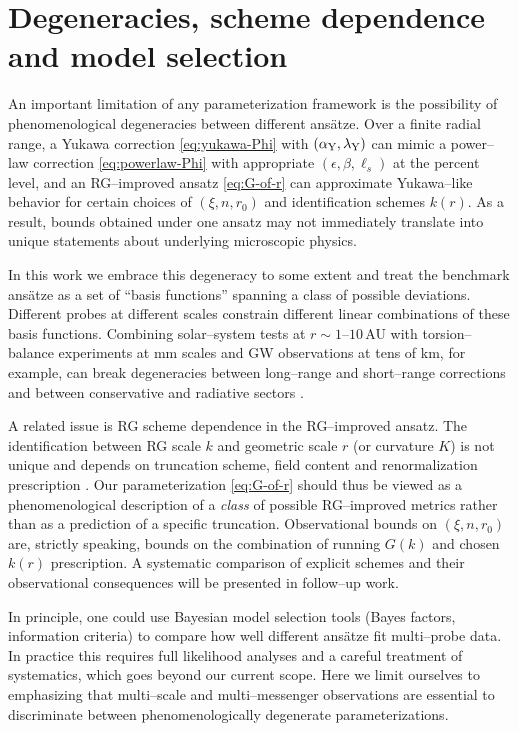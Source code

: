 \documentclass[11pt,a4paper]{article}
\begin{document}
\section{Degeneracies, scheme dependence and model selection}
\label{sec:degeneracies}

An important limitation of any parameterization framework is the possibility of phenomenological degeneracies between different ans\"atze. Over a finite radial range, a Yukawa correction \eqref{eq:yukawa-Phi} with $(\alpha_{\rm Y},\lambda_{\rm Y})$ can mimic a power--law correction \eqref{eq:powerlaw-Phi} with appropriate $(\epsilon,\beta,\ell_s)$ at the percent level, and an RG--improved ansatz \eqref{eq:G-of-r} can approximate Yukawa--like behavior for certain choices of $(\xi,n,r_0)$ and identification schemes $k(r)$. As a result, bounds obtained under one ansatz may not immediately translate into unique statements about underlying microscopic physics.

In this work we embrace this degeneracy to some extent and treat the benchmark ans\"atze as a set of ``basis functions'' spanning a class of possible deviations. Different probes at different scales constrain different linear combinations of these basis functions. Combining solar--system tests at $r\sim 1$--$10$\,AU with torsion--balance experiments at mm scales and GW observations at tens of km, for example, can break degeneracies between long--range and short--range corrections and between conservative and radiative sectors \cite{Berti2015,Clifton2012}.

A related issue is RG scheme dependence in the RG--improved ansatz. The identification between RG scale $k$ and geometric scale $r$ (or curvature $K$) is not unique and depends on truncation scheme, field content and renormalization prescription \cite{ReuterSaueressig2012}. Our parameterization \eqref{eq:G-of-r} should thus be viewed as a phenomenological description of a \emph{class} of possible RG--improved metrics rather than as a prediction of a specific truncation. Observational bounds on $(\xi,n,r_0)$ are, strictly speaking, bounds on the combination of running $G(k)$ and chosen $k(r)$ prescription. A systematic comparison of explicit schemes and their observational consequences will be presented in follow--up work.

In principle, one could use Bayesian model selection tools (Bayes factors, information criteria) to compare how well different ans\"atze fit multi--probe data. In practice this requires full likelihood analyses and a careful treatment of systematics, which goes beyond our current scope. Here we limit ourselves to emphasizing that multi--scale and multi--messenger observations are essential to discriminate between phenomenologically degenerate parameterizations.
\end{document}
